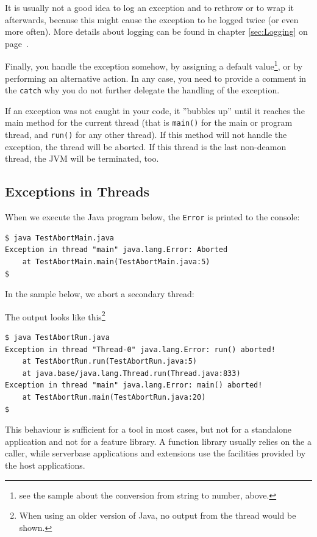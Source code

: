 \documentclass[11pt,a4paper, titlepage, parskip=half, headsepline, footsepline, cleardoublepage=current, headheight=1cm]{scrbook}
\newcommand*{\tqvref}[1]{\hyperref[{#1}]{\ref*{#1}} on page~\pageref{#1}}
\begin{document}
It is usually not a good idea to log an exception and to rethrow or to wrap it afterwards, because this might cause the exception to be logged twice (or even more often). More details about logging can be found in chapter \tqvref{sec:Logging}.

Finally, you handle the exception somehow, by assigning a default value\footnote{see the sample about the conversion from string to number, above.}, or by performing an alternative action. In any case, you need to provide a comment in the \lstinline|catch| why you do not further delegate the handling of the exception.

If an exception was not caught in your code, it ”bubbles up” until it reaches the main method for the current thread (that is \lstinline|main()| for the main or program thread, and \lstinline|run()|\autocite{ORACLE_DOC_RUNNABLE:run} for any other thread). If this method will not handle the exception, the thread will be aborted. If this thread is the last non-deamon thread, the JVM will be terminated, too.

\subsection{Exceptions in Threads}\label{sec:ExceptionHandlingInThreads}
When we execute the Java program below, the \lstinline|Error| is printed to the console:


\begin{verbatim}
$ java TestAbortMain.java
Exception in thread "main" java.lang.Error: Aborted
    at TestAbortMain.main(TestAbortMain.java:5)
$ 
\end{verbatim}

In the sample below, we abort a secondary thread:


The output looks like this\footnote{When using an older version of Java, no output from the thread would be shown.}
\begin{verbatim}
$ java TestAbortRun.java
Exception in thread "Thread-0" java.lang.Error: run() aborted!
    at TestAbortRun.run(TestAbortRun.java:5)
    at java.base/java.lang.Thread.run(Thread.java:833)
Exception in thread "main" java.lang.Error: main() aborted!
    at TestAbortRun.main(TestAbortRun.java:20)
$ 
\end{verbatim}

This behaviour is sufficient for a tool in most cases, but not for a standalone application and not for a feature library. A function library usually relies on the a caller, while serverbase applications and extensions use the facilities provided by the host applications.
\end{document}
